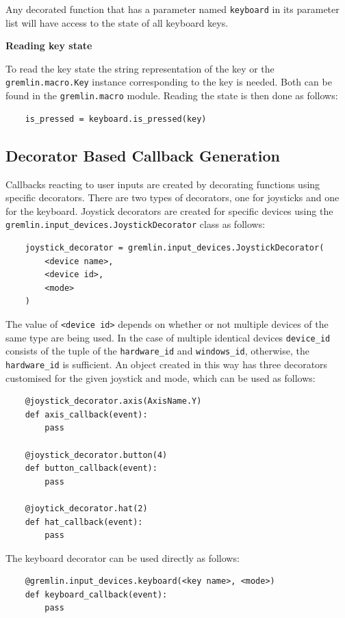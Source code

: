\documentclass[a4, 10pt]{article}
\begin{document}
Any decorated function that has a parameter named \verb+keyboard+ in its
parameter list will have access to the state of all keyboard keys.

\vspace{1em}
\noindent\textbf{Reading key state}

\noindent To read the key state the string representation of the key or
the \texttt{gremlin.macro.\allowbreak Key} instance corresponding to the
key is needed. Both can be found in the \texttt{gremlin.macro} module.
Reading the state is then done as follows:
\begin{verbatim}
    is_pressed = keyboard.is_pressed(key)
\end{verbatim}


\subsection{Decorator Based Callback Generation}

Callbacks reacting to user inputs are created by decorating functions
using specific decorators. There are two types of decorators, one for
joysticks and one for the keyboard. Joystick decorators are created for
specific devices using the\\
\verb+gremlin.input_devices.JoystickDecorator+ class as follows:
\begin{verbatim}
    joystick_decorator = gremlin.input_devices.JoystickDecorator(
        <device name>,
        <device id>,
        <mode>
    )
\end{verbatim}

The value of \verb+<device id>+ depends on whether or not multiple
devices of the same type are being used. In the case of multiple
identical devices \verb+device_id+ consists of the tuple of the
\verb+hardware_id+ and \verb+windows_id+, otherwise, the
\verb+hardware_id+ is sufficient. An object created in this way has
three decorators customised for the given joystick and mode, which can be
used as follows:
\begin{verbatim}
    @joystick_decorator.axis(AxisName.Y)
    def axis_callback(event):
        pass

    @joystick_decorator.button(4)
    def button_callback(event):
        pass

    @joytick_decorator.hat(2)
    def hat_callback(event):
        pass
\end{verbatim}

The keyboard decorator can be used directly as follows:
\begin{verbatim}
    @gremlin.input_devices.keyboard(<key name>, <mode>)
    def keyboard_callback(event):
        pass
\end{verbatim}
\end{document}
